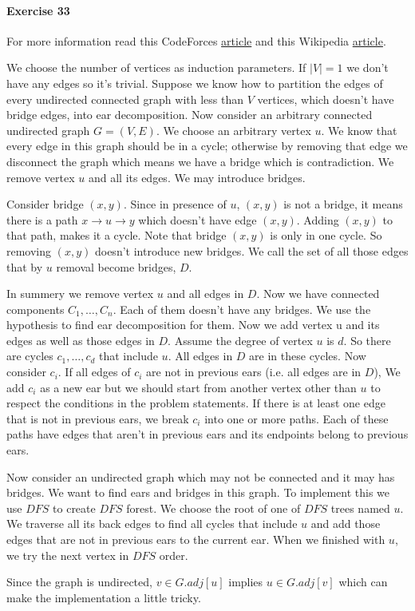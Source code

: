 \documentclass{book}
\begin{document}
	\paragraph{Exercise 33}
	For more information read this CodeForces \href{https://codeforces.com/blog/entry/80932}{article} and this Wikipedia \href{https://en.wikipedia.org/wiki/Ear_decomposition}{article}.
	\par We choose the number of vertices as induction parameters. If $|V| = 1$ we don't have any edges so it's trivial. Suppose we know how to partition the edges of every undirected connected graph with less than $V$ vertices, which doesn't have bridge edges, into ear decomposition. Now consider an arbitrary connected undirected graph $G = (V, E)$. We choose an arbitrary vertex $u$. We know that every edge in this graph should be in a cycle; otherwise by removing that edge we disconnect the graph which means we have a bridge which is contradiction. We remove vertex $u$ and all its edges. We may introduce bridges.
	\par Consider bridge $(x, y)$. Since in presence of $u$, $(x, y)$ is not a bridge, it means there is a path $x \to u \to y$ which doesn't have edge $(x, y)$. Adding $(x, y)$ to that path, makes it a cycle. Note that bridge $(x, y)$ is only in one cycle. So removing $(x, y)$ doesn't introduce new bridges. We call the set of all those edges that by $u$ removal become bridges, $D$.
	\par In summery we remove vertex $u$ and all edges in $D$. Now we have connected components $C_1, \dots, C_n$. Each of them doesn't have any bridges. We use the hypothesis to find ear decomposition for them. Now we add vertex u and its edges as well as those edges in $D$. Assume the degree of vertex $u$ is $d$. So there are cycles $c_1, \dots, c_d$ that include $u$. All edges in $D$ are in these cycles. Now consider $c_i$. If all edges of $c_i$ are not in previous ears (i.e. all edges are in $D$), We add $c_i$ as a new ear but we should start from another vertex other than $u$ to respect the conditions in the problem statements. If there is at least one edge that is not in previous ears, we break $c_i$ into one or more paths. Each of these paths have edges that aren't in previous ears and its endpoints belong to previous ears.
	\par Now consider an undirected graph which may not be connected and it may has bridges. We want to find ears and bridges in this graph. To implement this we use $DFS$ to create $DFS$ forest. We choose the root of one of $DFS$ trees named $u$. We traverse all its back edges to find all cycles that include $u$ and add those edges that are not in previous ears to the current ear. When we finished with $u$, we try the next vertex in $DFS$ order.
	\par Since the graph is undirected, $v \in G.adj[u]$ implies $u \in G.adj[v]$ which can make the implementation a little tricky.
	
\end{document}
